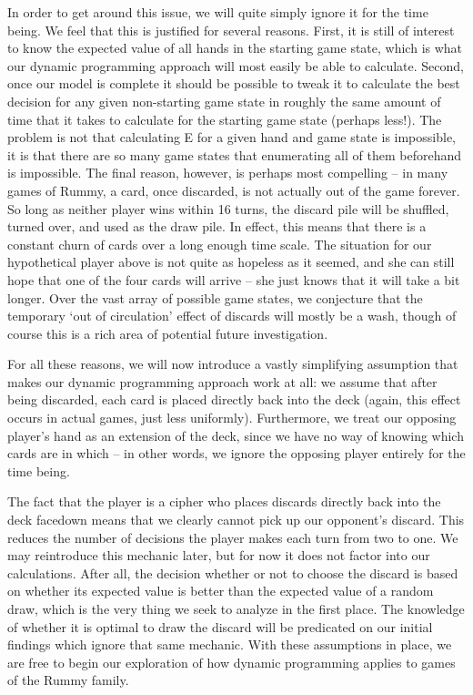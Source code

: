 \documentclass[paper=a4, fontsize=11pt,twoside]{report}   %
\begin{document}
In order to get around this issue, we will quite simply ignore it for the time being. We feel that this is justified for several reasons. First, it is still of interest to know the expected value of all hands in the starting game state, which is what our dynamic programming approach will most easily be able to calculate. Second, once our model is complete it should be possible to tweak it to calculate the best decision for any given non-starting game state in roughly the same amount of time that it takes to calculate for the starting game state (perhaps less!). The problem is not that calculating E for a given hand and game state is impossible, it is that there are so many game states that enumerating all of them beforehand is impossible. The final reason, however, is perhaps most compelling – in many games of Rummy, a card, once discarded, is not actually out of the game forever. So long as neither player wins within 16 turns, the discard pile will be shuffled, turned over, and used as the draw pile. In effect, this means that there is a constant churn of cards over a long enough time scale. The situation for our hypothetical player above is not quite as hopeless as it seemed, and she can still hope that one of the four cards will arrive – she just knows that it will take a bit longer. Over the vast array of possible game states, we conjecture that the temporary ‘out of circulation’ effect of discards will mostly be a wash, though of course this is a rich area of potential future investigation. 

For all these reasons, we will now introduce a vastly simplifying assumption that makes our dynamic programming approach work at all: we assume that after being discarded, each card is placed directly back into the deck (again, this effect occurs in actual games, just less uniformly). Furthermore, we treat our opposing player’s hand as an extension of the deck, since we have no way of knowing which cards are in which – in other words, we ignore the opposing player entirely for the time being.  

The fact that the player is a cipher who places discards directly back into the deck facedown means that we clearly cannot pick up our opponent’s discard. This reduces the number of decisions the player makes each turn from two to one. We may reintroduce this mechanic later, but for now it does not factor into our calculations. After all, the decision whether or not to choose the discard is based on whether its expected value is better than the expected value of a random draw, which is the very thing we seek to analyze in the first place. The knowledge of whether it is optimal to draw the discard will be predicated on our initial findings which ignore that same mechanic. With these assumptions in place, we are free to begin our exploration of how dynamic programming applies to games of the Rummy family.
\end{document}
